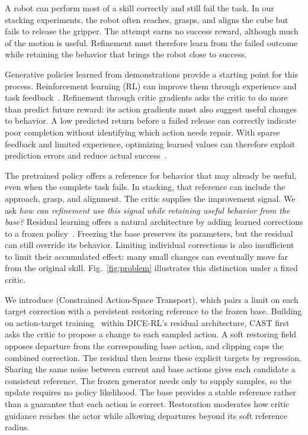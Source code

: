 A robot can perform most of a skill correctly and still fail the task.
In our stacking experiments, the robot often reaches, grasps, and aligns
the cube but fails to release the gripper. The attempt earns no success
reward, although much of the motion is useful. Refinement must therefore
learn from the failed outcome while retaining the behavior that brings
the robot close to success.

Generative policies learned from demonstrations provide a starting point
for this process. Reinforcement learning (RL) can improve them through
experience and task feedback~\cite{ren2024dppo,reinflow2025}. Refinement
through critic gradients asks the critic to do more than predict future reward:
its action gradients must also suggest useful changes to behavior. A low
predicted return before a failed release can correctly indicate poor
completion without identifying which action needs repair. With sparse
feedback and limited experience, optimizing learned values can therefore
exploit prediction errors and reduce actual
success~\cite{fujimoto2018td3,fujimoto2019bcq}.

The pretrained policy offers a reference for behavior that may already
be useful, even when the complete task fails. In stacking, that reference
can include the approach, grasp, and alignment. The critic supplies the
improvement signal. We ask \emph{how can refinement use this signal while
retaining useful behavior from the base?} Residual learning offers a
natural architecture by adding learned corrections to a frozen
policy~\cite{dicerl2026}. Freezing the base preserves its parameters, but
the residual can still override its behavior. Limiting individual
corrections is also insufficient to limit their accumulated effect:
many small changes can eventually move far from the original skill.
Fig.~\ref{fig:problem} illustrates this distinction under a fixed critic.



We introduce \method{} (Constrained Action-Space Transport), which pairs
a limit on each target correction with a persistent restoring reference
to the frozen base. Building on action-target
training~\cite{dipo2024,psenka2024qsm} within DICE-RL's residual architecture,
CAST first asks the critic to propose a change to each sampled action.
A soft restoring field opposes departure from the corresponding base
action, and clipping caps the combined correction. The residual then
learns these explicit targets by regression. Sharing the same noise
between current and base actions gives each candidate a consistent
reference. The frozen generator needs only to supply samples, so the
update requires no policy likelihood. The base provides a stable reference
rather than a guarantee that each action is correct. Restoration moderates
how critic guidance reaches the actor while allowing departures beyond
its soft reference radius.

